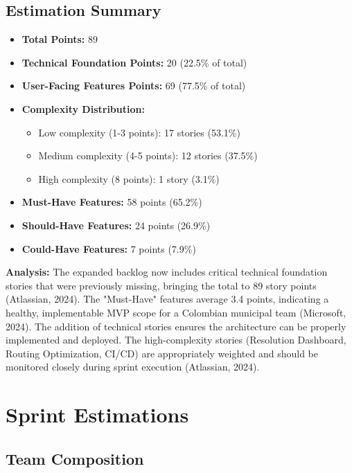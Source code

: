 \documentclass[12pt,a4paper]{article}
\begin{document}
\subsection{Estimation Summary}

\begin{itemize}
    \item \textbf{Total Points:} 89
    \item \textbf{Technical Foundation Points:} 20 (22.5\% of total)
    \item \textbf{User-Facing Features Points:} 69 (77.5\% of total)
    \item \textbf{Complexity Distribution:} 
    \begin{itemize}
        \item Low complexity (1-3 points): 17 stories (53.1\%)
        \item Medium complexity (4-5 points): 12 stories (37.5\%)
        \item High complexity (8 points): 1 story (3.1\%)
    \end{itemize}
    \item \textbf{Must-Have Features:} 58 points (65.2\%)
    \item \textbf{Should-Have Features:} 24 points (26.9\%)
    \item \textbf{Could-Have Features:} 7 points (7.9\%)
\end{itemize}

\textbf{Analysis:}
The expanded backlog now includes critical technical foundation stories that were previously missing, bringing the total to 89 story points (Atlassian, 2024). The "Must-Have" features average 3.4 points, indicating a healthy, implementable MVP scope for a Colombian municipal team (Microsoft, 2024). The addition of technical stories ensures the architecture can be properly implemented and deployed. The high-complexity stories (Resolution Dashboard, Routing Optimization, CI/CD) are appropriately weighted and should be monitored closely during sprint execution (Atlassian, 2024).

\section{Sprint Estimations}

\subsection{Team Composition}
\end{document}
